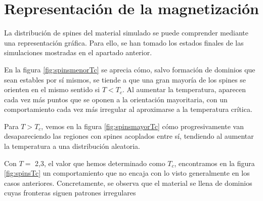 \documentclass{scrartcl}
\begin{document}
\clearpage
\section{Representación de la magnetización}
La distribución de spines del material simulado se puede comprender mediante una representación gráfica. Para ello, se han tomado los estados finales de las simulaciones mostradas en el apartado anterior.\par
En la figura \ref{fig:spinsmenorTc} se aprecia cómo, salvo formación de dominios que sean estables por sí mismos, se tiende a que una gran mayoría de los spines se orienten en el mismo sentido si $T<T_c$. Al aumentar la temperatura, aparecen cada vez más puntos que se oponen a la orientación mayoritaria, con un comportamiento cada vez más irregular al aproximarse a la temperatura crítica.\par
Para $T>T_c$, vemos en la figura \ref{fig:spinsmayorTc} cómo progresivamente van desapareciendo las regiones con spines acoplados entre sí, tendiendo al aumentar la temperatura a una distribución aleatoria.\par
Con $T=$ 2,3, el valor que hemos determinado como $T_c$, encontramos en la figura \ref{fig:spinsTc} un comportamiento que no encaja con lo visto generalmente en los casos anteriores. Concretamente, se observa que el material se llena de dominios cuyas fronteras siguen patrones irregulares
\end{document}
